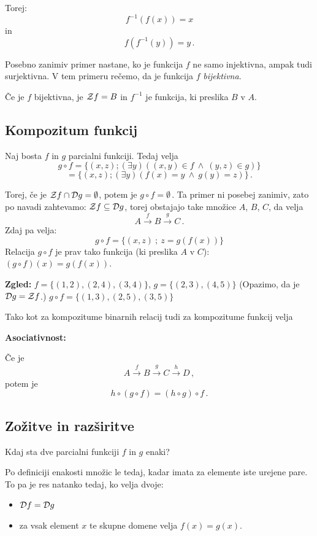 \documentclass[11pt,paper=b5,footinclude,headinclude]{scrbook} %
\def\inn {{~\wedge~}}
\begin{document}
Torej: $$f^{-1}(f(x)) = x$$
in
$$f(f^{-1}(y)) = y\,.$$

Posebno zanimiv primer nastane, ko je funkcija $f$ ne samo injektivna, ampak tudi surjektivna. V tem primeru rečemo, da je funkcija $f$ {\em bijektivna}.

Če je $f$ bijektivna, je ${\cal Z}f = B$ in $f^{-1}$ je funkcija, ki preslika $B$ v $A$.


%

\subsection{Kompozitum funkcij}

Naj bosta $f$ in $g$ parcialni funkciji. Tedaj velja
$$g\circ f = \{(x,z);(\exists y)((x,y)\in f\inn (y,z)\in g)\}$$
$$= \{(x,z);(\exists y)(f(x) = y \inn g(y) = z)\}\,.$$

Torej, če je ${\cal Z}f\cap {\cal D}g = \emptyset$, potem je $g\circ f = \emptyset\,.$ Ta primer ni posebej zanimiv, zato po navadi zahtevamo: ${\cal Z}f\subseteq {\cal D}g$, torej obstajajo take množice $A$, $B$, $C$, da velja $$A\overset{f}{\to} B\overset{g}{\to} C\,.$$ Zdaj pa velja:
$$g\circ f = \{(x,z)~;~z = g(f(x))\}$$
Relacija $g\circ f$ je prav tako funkcija (ki preslika $A$ v $C$): $(g\circ f)(x) = g(f(x))$.

\bigskip
\textbf{ Zgled:} $f = \{(1,2),(2,4),(3,4)\}$, $g = \{(2,3),(4,5)\}$
(Opazimo, da je ${\cal D}g = {\cal Z}f$.)
$g\circ f = \{(1,3),(2,5), (3,5)\}$

\bigskip
Tako kot za kompozitume binarnih relacij tudi za kompozitume funkcij velja

\medskip
\textbf{ Asociativnost:}

Če je
$$A\overset{f}{\to} B\overset{g}{\to} C\overset{h}{\to} D\,,$$
potem je
$$h\circ (g\circ f) = (h\circ g)\circ f\,.$$

\subsection{Zožitve in razširitve}
Kdaj sta dve parcialni funkciji $f$ in $g$ enaki?

Po definiciji enakosti množic le tedaj, kadar imata za elemente iste urejene pare. To pa je res natanko tedaj, ko velja dvoje:
\begin{itemize}
  \item ${\cal D}f = {\cal D}g$
  \item za vsak element $x$ te skupne domene velja $f(x) = g(x)$.
\end{itemize}
\end{document}

